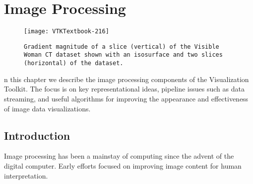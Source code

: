 \chapter{Image Processing}
\label{chap:image_processing}

\begin{figure}[ht]
	\hfill
	\begin{minipage}{0.5\textwidth}
		\centering
		\texttt{[image: VTKTextbook-216]}
		\caption*{\texttt{Gradient magnitude of a slice (vertical) of the Visible Woman CT dataset shown with an isosurface and two slices (horizontal) of the dataset.}}
	\end{minipage}
\end{figure}

n this chapter we describe the image processing components of the Visualization Toolkit.
The focus is on key representational ideas, pipeline issues such as data streaming, and useful algorithms for improving the appearance and effectiveness of image data visualizations.

\section{Introduction}
Image processing has been a mainstay of computing since the advent of the digital computer. Early efforts focused on improving image content for human interpretation.
